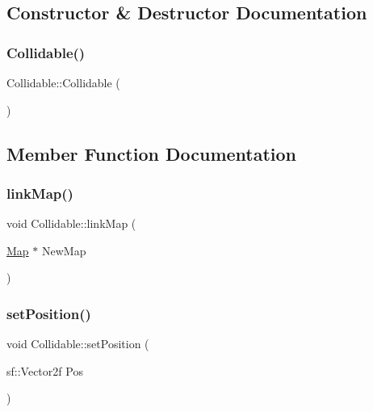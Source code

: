 \subsection{Constructor \& Destructor Documentation}
\mbox{\label{class_collidable_a92ce9e2b08086bb2f466168ffc69c9ed}} 
\subsubsection{\texorpdfstring{Collidable()}{Collidable()}}
{\footnotesize\ttfamily Collidable\+::\+Collidable (\begin{DoxyParamCaption}{ }\end{DoxyParamCaption})}



\subsection{Member Function Documentation}
\mbox{\label{class_collidable_ac62c1afe6fa4230c44d90cb3c1069d9c}} 
\subsubsection{\texorpdfstring{link\+Map()}{linkMap()}}
{\footnotesize\ttfamily void Collidable\+::link\+Map (\begin{DoxyParamCaption}\item[{\hyperlink{class_map}{Map} $\ast$}]{New\+Map }\end{DoxyParamCaption})}

\mbox{\label{class_collidable_acbba316c96106bbe80e52b88719c8d88}} 
\subsubsection{\texorpdfstring{set\+Position()}{setPosition()}}
{\footnotesize\ttfamily void Collidable\+::set\+Position (\begin{DoxyParamCaption}\item[{sf\+::\+Vector2f}]{Pos }\end{DoxyParamCaption})}

